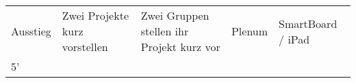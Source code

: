 \documentclass{article}
\begin{document}
\begin{tabularx}{\textwidth}{|X|X|X|X|X|}
Ausstieg                         & Zwei Projekte kurz vorstellen                                                                                               & Zwei Gruppen stellen ihr Projekt kurz vor                                            & Plenum                                                                                   & SmartBoard / iPad                                                           \\
5'                               &                                                                                                                             &                                                                                      &                                                                                          &                                                                             \\ \hline
\end{tabularx}
\end{document}
